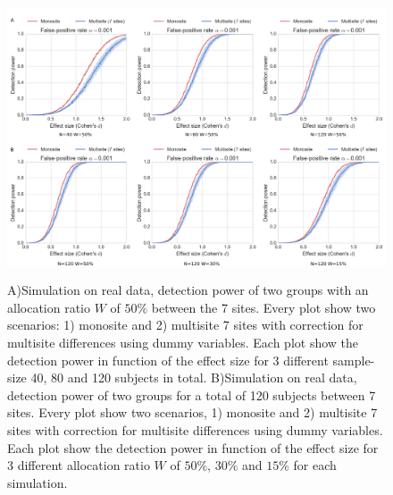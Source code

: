 \documentclass[authoryear]{elsarticle}
\begin{document}
\begin{figure}[tbp]
\centering
\captionsetup[subfloat]{labelformat=empty}
{\includegraphics[width=\textwidth]{../figures/simulations_real_7sites.png}}

\caption{
A)Simulation on real data, detection power of two groups with an allocation ratio $W$ of $50\%$ between the 7 sites. Every plot show two scenarios: 1) monosite and 2) multisite 7 sites with correction for multisite differences using dummy variables. Each plot show the detection power in function of the effect size for 3 different sample-size 40, 80 and 120 subjects in total.
B)Simulation on real data, detection power of two groups for a total of 120 subjects between 7 sites. Every plot show two scenarios, 1) monosite and 2) multisite 7 sites with correction for multisite differences using dummy variables. Each plot show the detection power in function of the effect size for 3 different allocation ratio $W$ of $50\%$, $30\%$ and $15\%$ for each simulation.
}
\label{fig_real_sim}
\end{figure}
\end{document}
